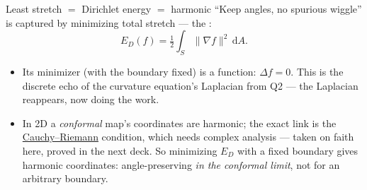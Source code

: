 \documentclass[aspectratio=169,10pt]{beamer}
\newcommand{\grad}{\nabla}
\newcommand{\Lap}{\Delta}
\newcommand{\half}{\tfrac{1}{2}}
\newcommand{\nm}[1]{\lVert #1\rVert}
\newcommand{\dd}{\mathrm{d}}
\begin{document}
\begin{frame}{Least stretch $=$ Dirichlet energy $=$ harmonic}
  ``Keep angles, no spurious wiggle'' is captured by minimizing total stretch --- the :
  \[
    E_D(f)=\half\int_S \nm{\grad f}^2\,\dd A .
  \]
  \begin{itemize}
    \item Its minimizer (with the boundary fixed) is a  function: $\Lap f=0$. This is the discrete echo of the curvature equation's Laplacian from Q2 --- the Laplacian reappears, now doing the work.
    \item In 2D a \emph{conformal} map's coordinates are harmonic; the exact link is the \href{https://en.wikipedia.org/wiki/Cauchy-Riemann_equations}{Cauchy--Riemann} condition, which needs complex analysis --- taken on faith here, proved in the next deck. So minimizing $E_D$ with a fixed boundary gives harmonic coordinates: angle-preserving \emph{in the conformal limit}, not for an arbitrary boundary.
  \end{itemize}
\end{frame}
\end{document}
